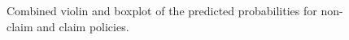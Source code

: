 \documentclass[
]{article}
\begin{document}
\begin{figure}[h]
    \caption{Combined violin and boxplot of the predicted probabilities for non-claim and claim policies.}
\end{figure}
\end{document}
